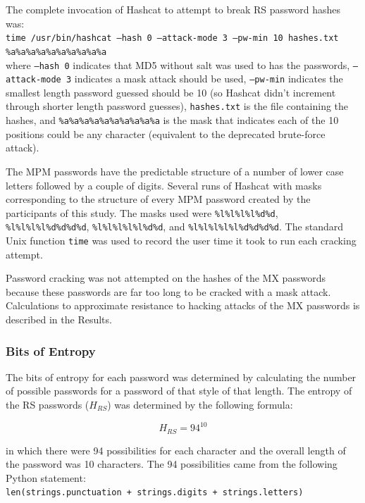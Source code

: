 \documentclass{article}
\begin{document}
The complete invocation of Hashcat to attempt to break RS password hashes was: \\

\texttt{time /usr/bin/hashcat --hash 0 --attack-mode 3 --pw-min 10 hashes.txt \%a\%a\%a\%a\%a\%a\%a\%a\%a\%a} \\

where \texttt{--hash 0} indicates that MD5 without salt was used to has the passwords, \texttt{--attack-mode 3} indicates a mask attack should be used, \texttt{--pw-min} indicates the smallest length password guessed should be 10 (so Hashcat didn't increment through shorter length password guesses), \texttt{hashes.txt} is the file containing the hashes, and \texttt{\%a\%a\%a\%a\%a\%a\%a\%a\%a\%a} is the mask that indicates each of the 10 positions could be any character (equivalent to the deprecated brute-force attack). 

The MPM passwords have the predictable structure of a number of lower case letters followed by a couple of digits. Several runs of Hashcat with masks corresponding to the structure of every MPM password created by the participants of this study. The masks used were \texttt{\%l\%l\%l\%l\%d\%d}, \texttt{\%l\%l\%l\%l\%d\%d\%d\%d}, \texttt{\%l\%l\%l\%l\%l\%d\%d}, and \texttt{\%l\%l\%l\%l\%l\%d\%d\%d\%d}. The standard Unix function \texttt{time} was used to record the user time it took to run each cracking attempt.

Password cracking was not attempted on the hashes of the MX passwords because these passwords are far too long to be cracked with a mask attack. Calculations to approximate resistance to hacking attacks of the MX passwords is described in the Results.

\subsubsection*{Bits of Entropy}
The bits of entropy for each password was determined by calculating the number of possible passwords for a password of that style of that length. The entropy of the RS passwords ($H_{RS}$) was determined by the following formula:

$$H_{RS} = 94^{10}$$

in which there were 94 possibilities for each character and the overall length of the password was 10 characters. The 94 possibilities came from the following Python statement: \\

\texttt{len(strings.punctuation + strings.digits + strings.letters)}\\
\end{document}
